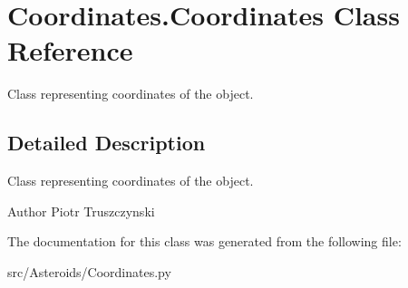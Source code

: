 \hypertarget{classCoordinates_1_1Coordinates}{}\section{Coordinates.\+Coordinates Class Reference}
\label{classCoordinates_1_1Coordinates}


Class representing coordinates of the object.  




\subsection{Detailed Description}
Class representing coordinates of the object. 

\begin{DoxyAuthor}{Author}
Piotr Truszczynski 
\end{DoxyAuthor}


The documentation for this class was generated from the following file\+:\begin{DoxyCompactItemize}
\item 
src/\+Asteroids/Coordinates.\+py\end{DoxyCompactItemize}
